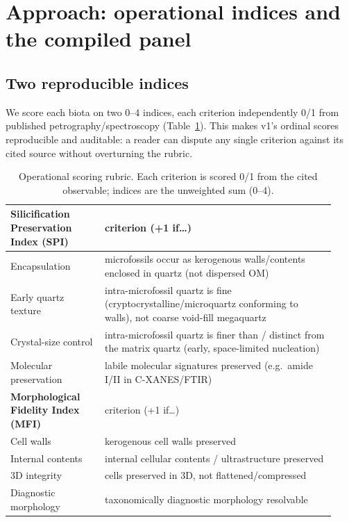 \documentclass[11pt]{article}
\begin{document}
\section{Approach: operational indices and the compiled panel}

\subsection{Two reproducible indices}

We score each biota on two 0--4 indices, each criterion independently 0/1 from published
petrography/spectroscopy (Table~\ref{tab:rubric}). This makes v1's ordinal scores reproducible and
auditable: a reader can dispute any single criterion against its cited source without overturning the
rubric.

\begin{table}[t]
\centering\small
\caption{Operational scoring rubric. Each criterion is scored 0/1 from the cited observable;
indices are the unweighted sum (0--4).}
\label{tab:rubric}
\begin{tabular}{p{0.27\linewidth}p{0.66\linewidth}}
\toprule
\textbf{Silicification Preservation Index (SPI)} & criterion (+1 if\ldots) \\
\midrule
Encapsulation & microfossils occur as kerogenous walls/contents enclosed in quartz (not dispersed OM) \\
Early quartz texture & intra-microfossil quartz is fine (cryptocrystalline/microquartz conforming to walls), not coarse void-fill megaquartz \\
Crystal-size control & intra-microfossil quartz is finer than / distinct from the matrix quartz (early, space-limited nucleation) \\
Molecular preservation & labile molecular signatures preserved (e.g.\ amide I/II in C-XANES/FTIR) \\
\midrule
\textbf{Morphological Fidelity Index (MFI)} & criterion (+1 if\ldots) \\
\midrule
Cell walls & kerogenous cell walls preserved \\
Internal contents & internal cellular contents / ultrastructure preserved \\
3D integrity & cells preserved in 3D, not flattened/compressed \\
Diagnostic morphology & taxonomically diagnostic morphology resolvable \\
\bottomrule
\end{tabular}
\end{table}
\end{document}
